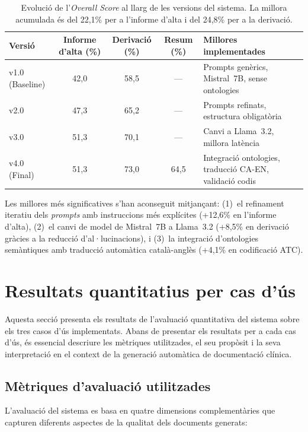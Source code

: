 \documentclass[CAT]{TFUOC}%
\begin{document}
\begin{table}[H]
\centering
\small
\begin{tabular}{lcccp{5cm}}
\hline
\textbf{Versió} & \textbf{Informe d'alta (\%)} & \textbf{Derivació (\%)} & \textbf{Resum (\%)} & \textbf{Millores implementades} \\
\hline
v1.0 (Baseline) & 42,0 & 58,5 & --- & Prompts genèrics, Mistral~7B, sense ontologies \\
v2.0 & 47,3 & 65,2 & --- & Prompts refinats, estructura obligatòria \\
v3.0 & 51,3 & 70,1 & --- & Canvi a Llama~3.2, millora latència \\
v4.0 (Final) & 51,3 & 73,0 & 64,5 & Integració ontologies, traducció CA-EN, validació codis \\
\hline
\end{tabular}
\caption{Evolució de l'\textit{Overall Score} al llarg de les versions del sistema. La millora acumulada és del 22,1\% per a l'informe d'alta i del 24,8\% per a la derivació.}
\label{tab:evolution}
\end{table}

Les millores més significatives s'han aconseguit mitjançant: (1)~el refinament iteratiu dels \textit{prompts} amb instruccions més explícites (+12,6\% en l'informe d'alta), (2)~el canvi de model de Mistral~7B a Llama~3.2 (+8,5\% en derivació gràcies a la reducció d'al·lucinacions), i (3)~la integració d'ontologies semàntiques amb traducció automàtica català-anglès (+4,1\% en codificació ATC).

\section{Resultats quantitatius per cas d'ús}

Aquesta secció presenta els resultats de l'avaluació quantitativa del sistema sobre els tres casos d'ús implementats. Abans de presentar els resultats per a cada cas d'ús, és essencial descriure les mètriques utilitzades, el seu propòsit i la seva interpretació en el context de la generació automàtica de documentació clínica.

\subsection{Mètriques d'avaluació utilitzades}

L'avaluació del sistema es basa en quatre dimensions complementàries que capturen diferents aspectes de la qualitat dels documents generats:
\end{document}

